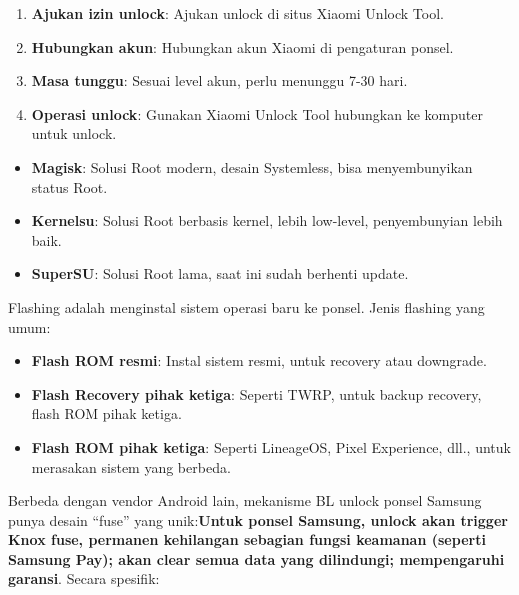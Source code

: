 
\begin{enumerate}
  \item \textbf{Ajukan izin unlock}: Ajukan unlock di situs Xiaomi Unlock Tool.
  \item \textbf{Hubungkan akun}: Hubungkan akun Xiaomi di pengaturan ponsel.
  \item \textbf{Masa tunggu}: Sesuai level akun, perlu menunggu 7-30 hari.
  \item \textbf{Operasi unlock}: Gunakan Xiaomi Unlock Tool hubungkan ke komputer untuk unlock.
\end{enumerate}


\begin{itemize}
  \item \textbf{Magisk}: Solusi Root modern, desain Systemless, bisa menyembunyikan status Root.
  \item \textbf{Kernelsu}: Solusi Root berbasis kernel, lebih low-level, penyembunyian lebih baik.
  \item \textbf{SuperSU}: Solusi Root lama, saat ini sudah berhenti update.
\end{itemize}


Flashing adalah menginstal sistem operasi baru ke ponsel. Jenis flashing yang umum:

\begin{itemize}
  \item \textbf{Flash ROM resmi}: Instal sistem resmi, untuk recovery atau downgrade.
  \item \textbf{Flash Recovery pihak ketiga}: Seperti TWRP, untuk backup recovery, flash ROM pihak ketiga.
  \item \textbf{Flash ROM pihak ketiga}: Seperti LineageOS, Pixel Experience, dll., untuk merasakan sistem yang berbeda.
\end{itemize}


Berbeda dengan vendor Android lain, mekanisme BL unlock ponsel Samsung punya desain “fuse” yang unik:\textbf{Untuk ponsel Samsung, unlock akan trigger Knox fuse, permanen kehilangan sebagian fungsi keamanan (seperti Samsung Pay); akan clear semua data yang dilindungi; mempengaruhi garansi}. Secara spesifik:


